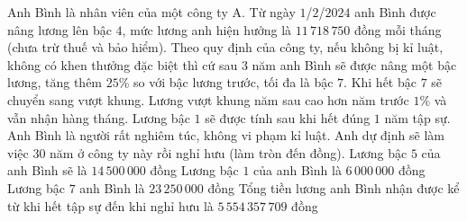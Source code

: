 \begin{ex}%
	Anh Bình là nhân viên của một công ty A. Từ ngày $1$/$2$/$2024$ anh Bình được nâng lương lên bậc $4$, mức lương anh hiện hưởng là $11\,718\,750$ đồng mỗi tháng (chưa trừ thuế và bảo hiểm). Theo quy định của công ty, nếu không bị kỉ luật, không có khen thưởng đặc biệt thì cứ sau $3$ năm anh Bình sẽ được nâng một bậc lương, tăng thêm $25$\% so với bậc lương trước, tối đa là bậc $7$. Khi hết bậc $7$ sẽ chuyển sang vượt khung. Lương vượt khung năm sau cao hơn năm trước $1$\% và vẫn nhận hàng tháng. Lương bậc $1$ sẽ được tính sau khi hết đúng $1$ năm tập sự. Anh Bình là người  rất nghiêm túc, không vi phạm kỉ luật. Anh dự định sẽ làm việc $30$ năm ở công ty này rồi nghỉ hưu (làm tròn đến đồng).
	\choiceTF 
		 {Lương bậc $5$ của anh Bình sẽ là $14\,500\,000$ đồng}
		 {\True Lương bậc $1$ của anh Bình là $6\,000\,000$ đồng}
		{Lương bậc $7$ anh Bình là $23\,250\,000$ đồng} 
		{\True Tổng tiền lương anh Bình nhận được kể từ khi hết tập sự đến  khi nghỉ hưu là $5\,554\,357\,709$ đồng}
\end{ex}


